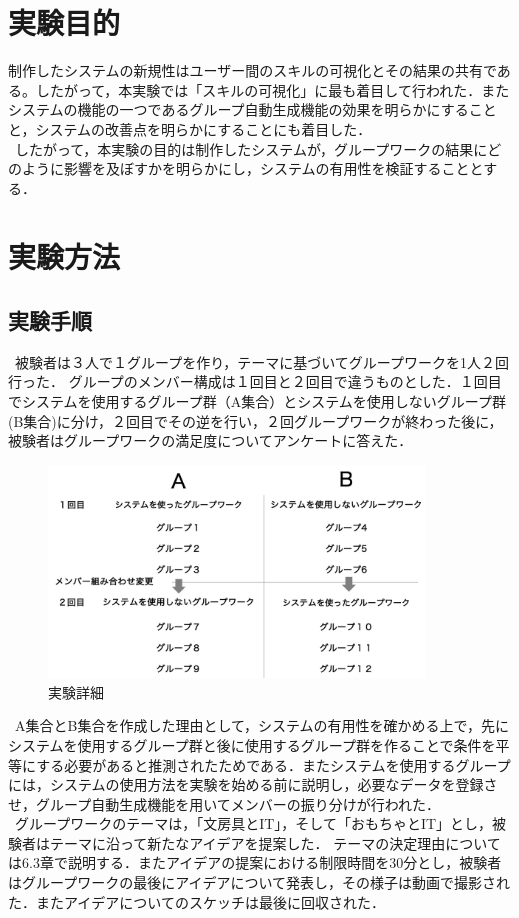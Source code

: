 \documentclass{funthesis}
\begin{document}
\section{実験目的}
制作したシステムの新規性はユーザー間のスキルの可視化とその結果の共有である。したがって，本実験では「スキルの可視化」に最も着目して行われた．またシステムの機能の一つであるグループ自動生成機能の効果を明らかにすることと，システムの改善点を明らかにすることにも着目した．\\
\ したがって，本実験の目的は制作したシステムが，グループワークの結果にどのように影響を及ぼすかを明らかにし，システムの有用性を検証することとする．
\section{実験方法}
\subsection{実験手順}
\ 被験者は３人で１グループを作り，テーマに基づいてグループワークを1人２回行った．
グループのメンバー構成は１回目と２回目で違うものとした．１回目でシステムを使用するグループ群（A集合）とシステムを使用しないグループ群(B集合)に分け，２回目でその逆を行い，２回グループワークが終わった後に，被験者はグループワークの満足度についてアンケートに答えた．

\begin{figure}[H]
 \centering
   \includegraphics[width=100mm]{figures/zikken1.png}
 \caption{実験詳細}
 \label{zikken1}
\end{figure}

\ A集合とB集合を作成した理由として，システムの有用性を確かめる上で，先にシステムを使用するグループ群と後に使用するグループ群を作ることで条件を平等にする必要があると推測されたためである．またシステムを使用するグループには，システムの使用方法を実験を始める前に説明し，必要なデータを登録させ，グループ自動生成機能を用いてメンバーの振り分けが行われた．\\
\ グループワークのテーマは，「文房具とIT」，そして「おもちゃとIT」とし，被験者はテーマに沿って新たなアイデアを提案した．
テーマの決定理由については6.3章で説明する．またアイデアの提案における制限時間を30分とし，被験者はグループワークの最後にアイデアについて発表し，その様子は動画で撮影された．またアイデアについてのスケッチは最後に回収された．
\end{document}
